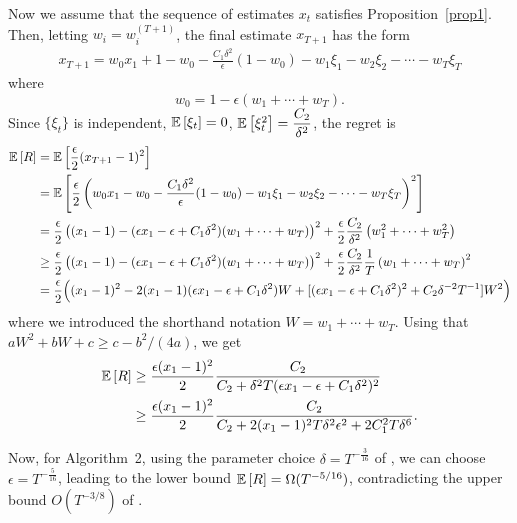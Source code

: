 \documentclass[11pt,letterpaper,english]{article}
\begin{document}
Now we assume that the sequence of estimates $x_t$ satisfies Proposition~\ref{prop1}. Then, letting $w_i=w^{(T+1)}_i$, the final estimate $x_{T+1}$ has the form
\begin{align*}
x_{T+1} = w_0 x_1 + 1-w_0 -\frac{C_1 \delta^2 }{\epsilon}(1-w_0) -w_1 \xi_1 - w_2 \xi_2 - \cdots - w_T \xi_T
\end{align*}
where
\[w_0 = 1-\epsilon (w_1+\cdots+w_T).\]
Since $\{\xi_t\}$ is independent, $\mathbb{E}\left[\xi_t\right]=0$, $\mathbb{E}\left[\xi_t^2\right]=\dfrac{C_2}{\delta^2}$, 
the regret is
\begin{align}
\mathbb{E}\left[R\right] &=\mathbb{E}\left[ \frac{\epsilon}{2} (x_{T+1}-1)^2\right] \nonumber \\
&= \mathbb{E}\left[\frac{\epsilon}{2} \left(w_0 x_1 -w_0 -\frac{C_1 \delta^2 }{\epsilon}(1-w_0) -w_1 \xi_1 - w_2 \xi_2 - \cdots - w_T \xi_T  \right)^2\right] \nonumber \\
&= \frac{\epsilon}{2} \left( (x_1-1)-(\epsilon x_1 -\epsilon +C_1\delta^2)(w_1+\cdots+w_T) \right)^2 + \dfrac{\epsilon}{2} \dfrac{C_2}{\delta^2} \left(w_1^2+\cdots+w_T^2  \right) \label{eq:lb2}\\
&\geq \dfrac{\epsilon}{2} \left( (x_1-1)-(\epsilon x_1 -\epsilon +C_1\delta^2)(w_1+\cdots+w_T) \right)^2 + \dfrac{\epsilon}{2} \dfrac{C_2}{\delta^2}\dfrac{1}{T} \left(w_1+\cdots+w_T  \right)^2 \nonumber \\
&= \frac{\epsilon}{2} \Bigl( (x_1-1)^2-2(x_1-1)(\epsilon x_1-\epsilon +C_1 \delta^2)W + [(\epsilon x_1-\epsilon +C_1 \delta^2)^2+C_2 \delta^{-2}T^{-1}]W^2  \Bigr)  \nonumber
\end{align}
where we introduced the shorthand notation $W = w_1+\cdots+w_T$.
Using that $a W^2 + bW +c \ge c-b^2/(4a)$, we get 
\begin{align*}
\mathbb{E}\left[R\right]  &\ge \frac{\epsilon (x_1-1)^2}{2} \frac{C_2}{C_2 + \delta^2 T(\epsilon x_1 - \epsilon +C_1 \delta^2)^2} \\
& \ge \frac{\epsilon (x_1-1)^2}{2} \frac{C_2}{C_2 + 2(x_1-1)^2 T \delta^2 \epsilon^2+ 2 C_1^2 T \delta^6}.
\end{align*}



Now, for Algorithm~2, using the parameter choice $\delta=T^{-\frac{3}{16}}$ of \citet{DekelEK15}, we can choose $\epsilon=T^{-\frac{5}{16}}$, leading to the lower bound $\mathbb{E}\left[R\right] = \Omega(T^{-5/16})$, contradicting the upper bound $O(T^{-3/8})$ of \citet{DekelEK15}.




\end{document}

